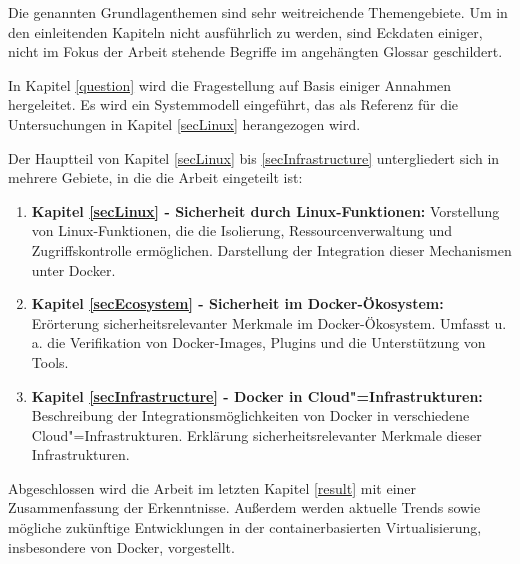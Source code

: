 \documentclass[../main.tex]{subfiles}
\begin{document}
    Die genannten Grundlagenthemen sind sehr weitreichende Themengebiete. Um in den einleitenden Kapiteln nicht ausführlich zu werden, sind Eckdaten einiger, nicht im Fokus der Arbeit stehende Begriffe im angehängten Glossar geschildert.

    In Kapitel \ref{question} wird die Fragestellung auf Basis einiger Annahmen hergeleitet. Es wird ein Systemmodell eingeführt, das als Referenz für die Untersuchungen in Kapitel \ref{secLinux} herangezogen wird.

    Der Hauptteil von Kapitel \ref{secLinux} bis \ref{secInfrastructure} untergliedert sich in mehrere Gebiete, in die die Arbeit eingeteilt ist:
    \begin{enumerate}
      \item \textbf{Kapitel \ref{secLinux} - Sicherheit durch Linux-Funktionen:} Vorstellung von Linux-Funktionen, die die Isolierung, Ressourcenverwaltung und Zugriffskontrolle ermöglichen. Darstellung der Integration dieser Mechanismen unter Docker.
      \item \textbf{Kapitel \ref{secEcosystem} - Sicherheit im Docker-Ökosystem:} Erörterung sicherheitsrelevanter Merkmale im Docker-Ökosystem. Umfasst u.\,a. die Verifikation von Docker-Images, Plugins und die Unterstützung von Tools.
      \item \textbf{Kapitel \ref{secInfrastructure} - Docker in Cloud"=Infrastrukturen:} Beschreibung der Integrationsmöglichkeiten von Docker in verschiedene Cloud"=Infrastrukturen. Erklärung sicherheitsrelevanter Merkmale dieser Infrastrukturen.
    \end{enumerate}

    Abgeschlossen wird die Arbeit im letzten Kapitel \ref{result} mit einer Zusammenfassung der Erkenntnisse. Außerdem werden aktuelle Trends sowie mögliche zukünftige Entwicklungen in der containerbasierten Virtualisierung, insbesondere von Docker, vorgestellt.
\end{document}
